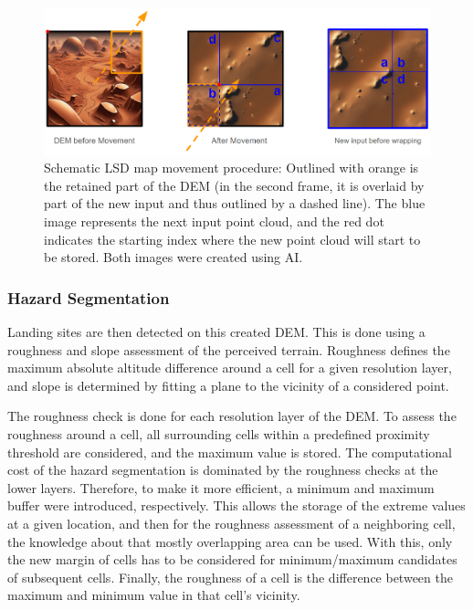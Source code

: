 \begin{figure}[ht!]
    \centering
    \includegraphics[scale=0.27]{images/system_overview/map_movement.png}
    \caption{Schematic LSD map movement procedure: Outlined with orange is the retained part of the DEM (in the second frame, it is overlaid by part of the new input and thus outlined by a dashed line). The blue image represents the next input point cloud, and the red dot indicates the starting index where the new point cloud will start to be stored. Both images were created using AI.}
    \label{fig:map_movement}
\end{figure}


\subsubsection{Hazard Segmentation}\label{subsubsec:setup:haz_seg}

Landing sites are then detected on this created DEM. This is done using a roughness and slope assessment of the perceived terrain. Roughness defines the maximum absolute altitude difference around a cell for a given resolution layer, and slope is determined by fitting a plane to the vicinity of a considered point.

The roughness check is done for each resolution layer of the DEM. To assess the roughness around a cell, all surrounding cells within a predefined proximity threshold are considered, and the maximum value is stored. The computational cost of the hazard segmentation is dominated by the roughness checks at the lower layers. Therefore, to make it more efficient, a minimum and maximum buffer were introduced, respectively. This allows the storage of the extreme values at a given location, and then for the roughness assessment of a neighboring cell, the knowledge about that mostly overlapping area can be used. With this, only the new margin of cells has to be considered for minimum/maximum candidates of subsequent cells. Finally, the roughness of a cell is the difference between the maximum and minimum value in that cell's vicinity.

